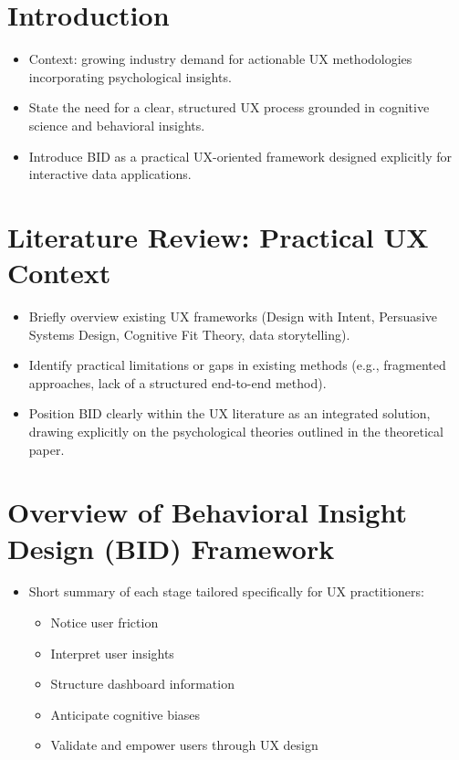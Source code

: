 \documentclass[
  authoryear,
  preprint]{elsarticle}
\providecommand{\tightlist}{%
  \setlength{\itemsep}{0pt}\setlength{\parskip}{0pt}}\usepackage{longtable,booktabs,array}
\begin{document}
\section{Introduction}\label{introduction}

\begin{itemize}
\tightlist
\item
  Context: growing industry demand for actionable UX methodologies
  incorporating psychological insights.
\item
  State the need for a clear, structured UX process grounded in
  cognitive science and behavioral insights.
\item
  Introduce BID as a practical UX-oriented framework designed explicitly
  for interactive data applications.
\end{itemize}

\section{Literature Review: Practical UX
Context}\label{literature-review-practical-ux-context}

\begin{itemize}
\tightlist
\item
  Briefly overview existing UX frameworks (Design with Intent,
  Persuasive Systems Design, Cognitive Fit Theory, data storytelling).
\item
  Identify practical limitations or gaps in existing methods (e.g.,
  fragmented approaches, lack of a structured end-to-end method).
\item
  Position BID clearly within the UX literature as an integrated
  solution, drawing explicitly on the psychological theories outlined in
  the theoretical paper.
\end{itemize}

\section{Overview of Behavioral Insight Design (BID)
Framework}\label{overview-of-behavioral-insight-design-bid-framework}

\begin{itemize}
\tightlist
\item
  Short summary of each stage tailored specifically for UX
  practitioners:

  \begin{itemize}
  \tightlist
  \item
    Notice user friction
  \item
    Interpret user insights
  \item
    Structure dashboard information
  \item
    Anticipate cognitive biases
  \item
    Validate and empower users through UX design
  \end{itemize}
\end{itemize}
\end{document}
